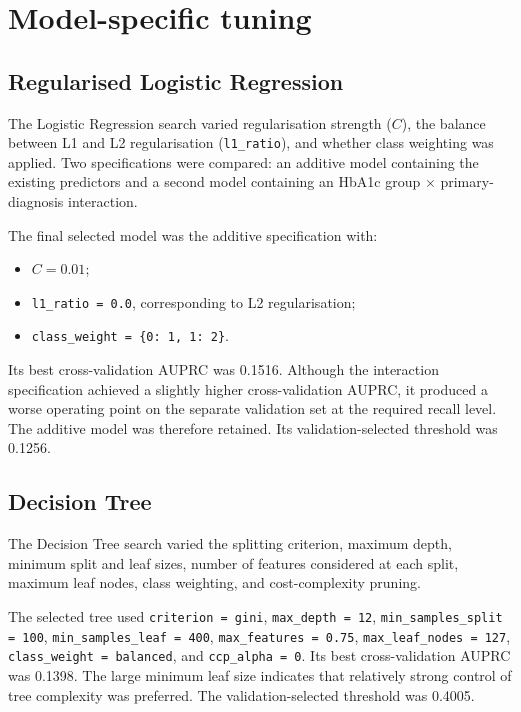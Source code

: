 \documentclass[11pt,a4paper]{article}
\begin{document}
\section{Model-specific tuning}

\subsection{Regularised Logistic Regression}

The Logistic Regression search varied regularisation strength ($C$), the balance between L1 and L2 regularisation (\texttt{l1\_ratio}), and whether class weighting was applied. Two specifications were compared: an additive model containing the existing predictors and a second model containing an HbA1c group $\times$ primary-diagnosis interaction.

The final selected model was the additive specification with:

\begin{itemize}
    \item $C = 0.01$;
    \item \texttt{l1\_ratio = 0.0}, corresponding to L2 regularisation;
    \item \texttt{class\_weight = \{0: 1, 1: 2\}}.
\end{itemize}

Its best cross-validation AUPRC was 0.1516. Although the interaction specification achieved a slightly higher cross-validation AUPRC, it produced a worse operating point on the separate validation set at the required recall level. The additive model was therefore retained. Its validation-selected threshold was 0.1256.

\subsection{Decision Tree}

The Decision Tree search varied the splitting criterion, maximum depth, minimum split and leaf sizes, number of features considered at each split, maximum leaf nodes, class weighting, and cost-complexity pruning.

The selected tree used \texttt{criterion = gini}, \texttt{max\_depth = 12}, \texttt{min\_samples\_split = 100}, \texttt{min\_samples\_leaf = 400}, \texttt{max\_features = 0.75}, \texttt{max\_leaf\_nodes = 127}, \texttt{class\_weight = balanced}, and \texttt{ccp\_alpha = 0}. Its best cross-validation AUPRC was 0.1398. The large minimum leaf size indicates that relatively strong control of tree complexity was preferred. The validation-selected threshold was 0.4005.
\end{document}
